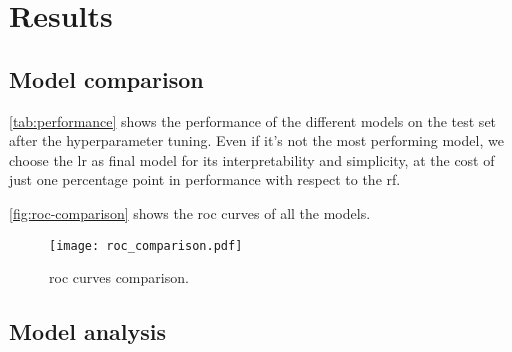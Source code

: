 \section{Results}

\subsection{Model comparison}

\autoref{tab:performance} shows the performance of the different models on the test set after the hyperparameter tuning.
Even if it's not the most performing model, we choose the \gls{lr} as final model for its interpretability and simplicity, at the cost of just one percentage point in performance with respect to the \gls{rf}.

\autoref{fig:roc-comparison} shows the \gls{roc} curves of all the models.



\begin{figure}[htpb]
    \centering
    \texttt{[image: roc\_comparison.pdf]}
    \caption{\gls{roc} curves comparison.}
    \label{fig:roc-comparison}
\end{figure}




\subsection{Model analysis}

